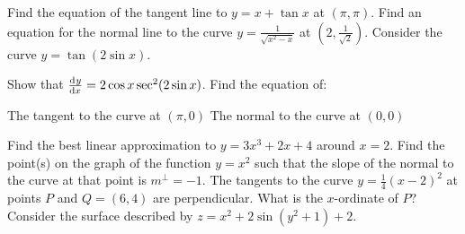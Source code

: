 \begin{questions}
  \questioM Find the equation of the tangent line to $ y = x + \tan x $ at $ (\pi, \pi) $.
  \questioM Find an equation for the normal line to the curve $ y = \frac{1}{\sqrt{x^2 - x}} $ at $ (2, \frac{1}{\sqrt{2}}) $.
  \question Consider the curve $ y = \tan(2\sin x) $.
    \begin{parts}
      \parA Show that $ \od{y}{x} = 2\cos x \sec^2 (2 \sin x) $.
      \parM Find the equation of:
        \begin{subparts}
          \subpart The tangent to the curve at $ (\pi, 0) $
          \subpart The normal to the curve at $ (0, 0) $
        \end{subparts}
    \end{parts}
  \questioM Find the best linear approximation to $ y = 3x^3 + 2x + 4 $ around $ x = 2 $.
  \questioM Find the point(s) on the graph of the function $ y = x^2 $ such that the slope of the normal to the curve at that point is $ m^\perp = -1 $.
  \questioE The tangents to the curve $ y = \frac{1}{4}(x - 2)^2 $ at points $ P $ and $ Q = (6,4) $ are perpendicular. What is the $ x$-ordinate of $ P $?
  \questioS Consider the surface described by $ z = x^2 + 2\sin(y^2 + 1) + 2 $.
\end{questions}
